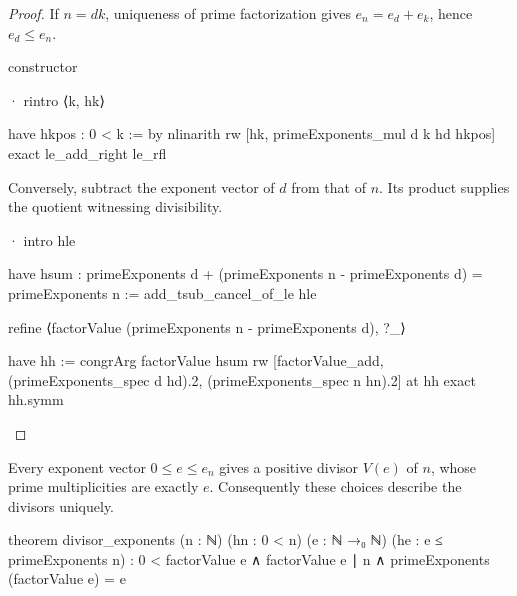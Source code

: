 \begin{proof}
  If $n=dk$, uniqueness of prime factorization gives $e_n=e_d+e_k$, hence $e_d\le e_n$.

  \begin{lean}
    constructor

    · rintro ⟨k, hk⟩

      have hkpos : 0 < k := by
        nlinarith
      rw [hk, primeExponents_mul d k hd hkpos]
      exact le_add_right le_rfl
  \end{lean}

  Conversely, subtract the exponent vector of $d$ from that of $n$.
  Its product supplies the quotient witnessing divisibility.

  \begin{lean}
    · intro hle

      have hsum : primeExponents d + (primeExponents n - primeExponents d) =
          primeExponents n := add_tsub_cancel_of_le hle

      refine ⟨factorValue (primeExponents n - primeExponents d), ?_⟩

      have hh := congrArg factorValue hsum
      rw [factorValue_add, (primeExponents_spec d hd).2, (primeExponents_spec n hn).2] at hh
      exact hh.symm
  \end{lean}
\end{proof}

\begin{theorem}
  \label{ent:thm:divisor-exponents}
  Every exponent vector $0\le e\le e_n$ gives a positive divisor $V(e)$ of $n$, whose prime
  multiplicities are exactly $e$.
  Consequently these choices describe the divisors uniquely.

  \begin{lean}
    theorem divisor_exponents (n : ℕ) (hn : 0 < n) (e : ℕ →₀ ℕ)
        (he : e ≤ primeExponents n) :
        0 < factorValue e ∧ factorValue e ∣ n ∧ primeExponents (factorValue e) = e
  \end{lean}
\end{theorem}

